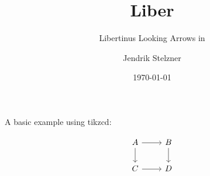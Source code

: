 \documentclass{scrartcl}
\title{Liber\tikzlogo{}}
\subtitle{Libertinus Looking Arrows in \tikzlogo{}}
\author{Jendrik Stelzner}
\date{\today}
\begin{document}
\maketitle

A basic example using tikzcd:

\[
	\begin{tikzcd}
		A
		\arrow{r}
		\arrow{d}
		&
		B
		\arrow{d}
		\\
		C
		\arrow{r}
		&
		D
	\end{tikzcd}
\]
\end{document}
